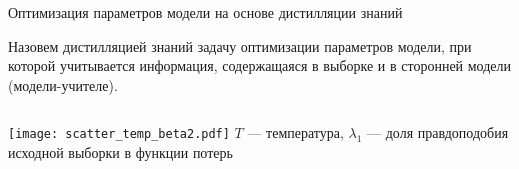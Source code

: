 \documentclass[10pt, aspectratio=169]{beamer}
\begin{document}
\begin{frame}{Оптимизация параметров модели на основе дистилляции знаний}










Назовем {\color{red}дистилляцией знаний} задачу оптимизации параметров модели, при которой учитывается информация, содержащаяся в выборке и в сторонней модели (модели-учителе).

\centering
\begin{columns}[c]
\centering
\texttt{[image: scatter\_temp\_beta2.pdf]}
\hspace{-2 cm}
$T$ --- температура, $\lambda_1$ --- доля правдоподобия исходной выборки в функции потерь

\end{columns}
\end{frame}
\end{document}
